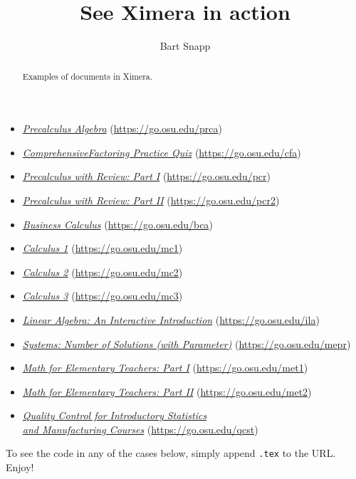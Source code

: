 \documentclass{ximera}
\title{See Ximera in action}
\author{Bart Snapp}
\begin{document}
\begin{abstract}
Examples of documents in Ximera.
\end{abstract}
\maketitle


\renewcommand*{\link}[2][]{\href{#2}{#1}%
\hfill(\url{#2})
}

\begin{itemize}[label={},leftmargin=*]
\item \link[\textit{Precalculus Algebra}]{https://go.osu.edu/prca} 
\item \link[\textit{ComprehensiveFactoring   Practice   Quiz}]{https://go.osu.edu/cfa}
\item \link[\textit{Precalculus with Review: Part I}]{https://go.osu.edu/pcr}        
\item \link[\textit{Precalculus with Review: Part II}]{https://go.osu.edu/pcr2}        
\item \link[\textit{Business Calculus}]{https://go.osu.edu/bca}
\item \link[\textit{Calculus 1}]{https://go.osu.edu/mc1}
\item \link[\textit{Calculus 2}]{https://go.osu.edu/mc2}
\item \link[\textit{Calculus 3}]{https://go.osu.edu/mc3}
\item \link[\textit{Linear  Algebra: An Interactive Introduction}]{https://go.osu.edu/ila} 
\item \link[\textit{Systems: Number of Solutions (with Parameter)}]{https://go.osu.edu/mepr} 
\item \link[\textit{Math for Elementary Teachers:	 Part I}]{https://go.osu.edu/met1} 
\item \link[\textit{Math for Elementary Teachers: Part II}]{https://go.osu.edu/met2}
\item \link[\textit{Quality Control for Introductory Statistics\\ and Manufacturing Courses}]{https://go.osu.edu/qcst} 
\end{itemize}
To see the code in any of the cases below, simply append \verb!.tex! to the URL. Enjoy!
\end{document}
